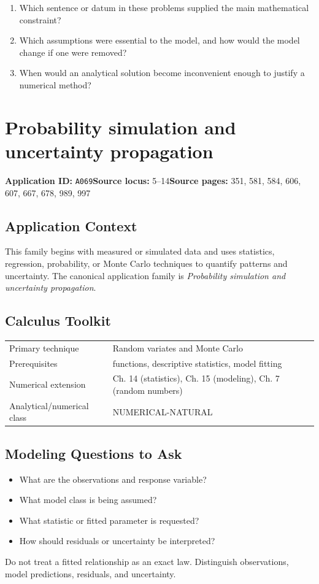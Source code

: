 \documentclass[11pt]{book}
\newcommand{\pid}[1]{\texttt{#1}}
\begin{document}
\begin{reflectionbox}\begin{enumerate}
\item Which sentence or datum in these problems supplied the main mathematical constraint?
\item Which assumptions were essential to the model, and how would the model change if one were removed?
\item When would an analytical solution become inconvenient enough to justify a numerical method?
\end{enumerate}\end{reflectionbox}
\chapter{Probability simulation and uncertainty propagation}\label{app:A069}
\textbf{Application ID:} \pid{A069}\quad \textbf{Source locus:} 5–14\quad \textbf{Source pages:} 351, 581, 584, 606, 607, 667, 678, 989, 997
\section*{Application Context}
This family begins with measured or simulated data and uses statistics, regression, probability, or Monte Carlo techniques to quantify patterns and uncertainty. The canonical application family is \emph{Probability simulation and uncertainty propagation}.
\section*{Calculus Toolkit}
\begin{tabularx}{\textwidth}{@{}lX@{}}\toprule
Primary technique & Random variates and Monte Carlo \\
Prerequisites & functions, descriptive statistics, model fitting \\
Numerical extension & Ch. 14 (statistics), Ch. 15 (modeling), Ch. 7 (random numbers) \\
Analytical/numerical class & NUMERICAL-NATURAL \\
\bottomrule\end{tabularx}
\section*{Modeling Questions to Ask}\begin{itemize}
\item What are the observations and response variable?
\item What model class is being assumed?
\item What statistic or fitted parameter is requested?
\item How should residuals or uncertainty be interpreted?
\end{itemize}
\begin{errorbox}Do not treat a fitted relationship as an exact law. Distinguish observations, model predictions, residuals, and uncertainty.\end{errorbox}
\end{document}
